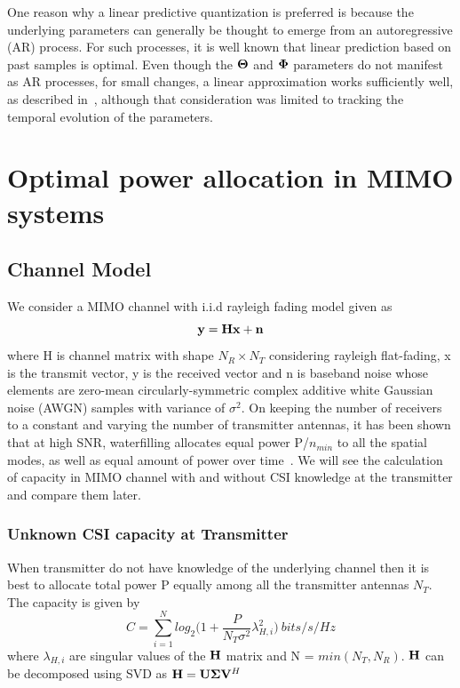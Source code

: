 \documentclass[11pt,a4paper]{report}
\def\bn{{\bf n}}
\def\bx{{\bf x}}
\def\by{{\bf y}}
\def\bSigma{{\bf \Sigma}}
\def\bH{{\bf H}}
\def\bU{{\bf U}}
\def\bV{{\bf V}}
\begin{document}
One reason why a linear predictive quantization is preferred is
because the underlying parameters can generally be thought to emerge
from an autoregressive (AR) process. For such processes, it is well
known that linear prediction based on past samples is optimal. Even
though the $\bf{\Theta}$ and $\bf{\Phi}$ parameters do not manifest as AR
processes, for small changes, a linear approximation works
sufficiently well, as described in~\cite{4114278}, although that
consideration was limited to tracking the temporal evolution of the
parameters.

\chapter{Optimal power allocation in MIMO systems}
\label{chap:cap}

\section{Channel Model}
\label{sec:1}
We consider a MIMO channel with i.i.d rayleigh fading model given as
\begin{equation}
\by = \bH\bx + \bn
\end{equation}
where H is channel matrix with shape $N_R\times N_T$ considering rayleigh flat-fading,
x is the transmit vector, y is the received vector and n is baseband
noise whose elements are zero-mean circularly-symmetric complex additive 
white Gaussian noise (AWGN) samples with variance of $\sigma^2$.
On keeping the number of receivers to a constant and varying the number of transmitter
antennas, it has been shown that at high SNR, waterfilling allocates
equal power P/$n_{min}$ to all the spatial modes, as well as equal amount
of power over time~\cite{10.5555/1111206}.
We will see the calculation of capacity in MIMO channel with and without
CSI knowledge at the transmitter and compare them later.

\subsection{Unknown CSI capacity at Transmitter}
When transmitter do not have knowledge of the underlying channel
then it is best to allocate total power P equally among all the 
transmitter antennas $N_T$. The capacity is given by~\cite{Foschini1998, Khalighi2002, 6770094} 
\begin{equation}
C = \sum_{i=1}^{N}log_{2}\big(1 + \frac{P}{N_{T}\sigma^2}\lambda^{2}_{H,i}\big)\: bits/s/Hz
\end{equation}
where $\lambda_{H,i}$ are singular values of the $\bH$ matrix and N = $min(N_T, N_R)$.
$\bH$ can be decomposed using SVD as $\bH = \bU\bSigma\bV^H$
\end{document}
